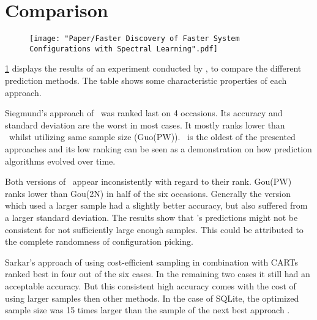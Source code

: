 \section{Comparison}
\begin{figure}[t]
	\centering
	\label{tab:ConclusionPerformanceOverview}
	\vspace{-.5\baselineskip}
	\texttt{[image: "Paper/Faster Discovery of Faster System Configurations with Spectral Learning".pdf]}
	\vspace{-1\baselineskip}	
\end{figure}
\cref{tab:ConclusionPerformanceOverview} displays the results of an experiment conducted by \citet{FasterDiscoveryofFasterSystemConfigurationsSiegmund2017}, to compare the different prediction methods. The table shows some characteristic properties of each approach.

Siegmund's approach of \AFID~was ranked last on 4 occasions. Its accuracy and standard deviation are the worst in most cases. It mostly ranks lower than \VAPP~whilst utilizing same sample size (Guo(PW)). \WHAT~is the oldest of the presented approaches and its low ranking can be seen as a demonstration on how prediction algorithms evolved over time.

Both versions of \VAPP~appear inconsistently with regard to their rank. Gou(PW) ranks lower than Gou(2N) in half of the six occasions. Generally the version which used a larger sample had a slightly better accuracy, but also suffered from a larger standard deviation. The results show that \VAPP's predictions might not be consistent for not sufficiently large enough samples. This could be attributed to the complete randomness of configuration picking.

Sarkar's approach of using cost-efficient sampling in combination with CARTs ranked best in four out of the six cases. In the remaining two cases it still had an acceptable accuracy. But this consistent high accuracy comes with the cost of using larger samples then other methods. In the case of SQLite, the optimized sample size was 15 times larger than the sample of the next best approach \WHAT. 

